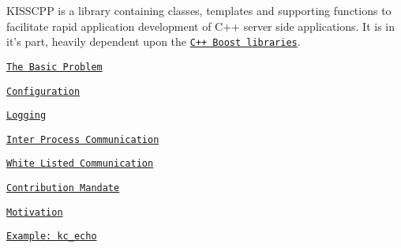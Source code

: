 K\-I\-S\-S\-C\-P\-P is a library containing classes, templates and supporting functions to facilitate rapid application development of C++ server side applications. It is in it's part, heavily dependent upon the \href{http://boost.org}{\tt C++ Boost libraries}.


\begin{DoxyItemize}
\item \href{md_the_basic_problem.html}{\tt The Basic Problem}
\item \href{md_configuration.html}{\tt Configuration}
\item \href{md_logging.html}{\tt Logging}
\item \href{md_inter_process_communication.html}{\tt Inter Process Communication}
\begin{DoxyItemize}
\item \href{md_white_listed_communications.html}{\tt White Listed Communication}
\end{DoxyItemize}
\item \href{md_mandate.html}{\tt Contribution Mandate}
\item \href{md_motivation.html}{\tt Motivation}
\item \href{md_example_echo.html}{\tt Example\-: kc\-\_\-echo} 
\end{DoxyItemize}